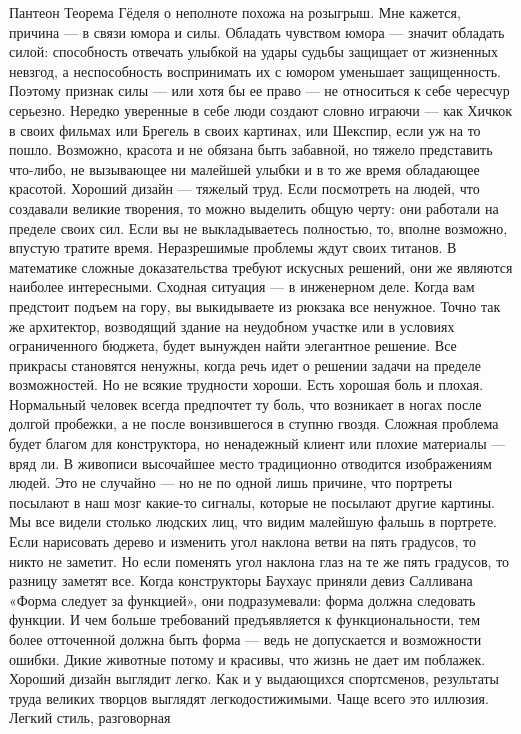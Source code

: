 \documentclass[ebook,12pt,oneside,openany]{memoir}
\begin{document}
Пантеон Теорема Гёделя о неполноте похожа на розыгрыш. Мне кажется,
причина — в связи юмора и силы. Обладать чувством юмора — значит
обладать силой: способность отвечать улыбкой на удары судьбы защищает
от жизненных невзгод, а неспособность воспринимать их с юмором
уменьшает защищенность. Поэтому признак силы — или хотя бы ее право —
не относиться к себе чересчур серьезно. Нередко уверенные в себе люди
создают словно играючи — как Хичкок в своих фильмах или Брегель в
своих картинах, или Шекспир, если уж на то пошло. Возможно, красота и
не обязана быть забавной, но тяжело представить что-либо, не
вызывающее ни малейшей улыбки и в то же время обладающее красотой.
Хороший дизайн — тяжелый труд. Если посмотреть на людей, что создавали
великие творения, то можно выделить общую черту: они работали на
пределе своих сил. Если вы не выкладываетесь полностью, то, вполне
возможно, впустую тратите время. Неразрешимые проблемы ждут своих
титанов. В математике сложные доказательства требуют искусных решений,
они же являются наиболее интересными. Сходная ситуация — в инженерном
деле. Когда вам предстоит подъем на гору, вы выкидываете из рюкзака
все ненужное. Точно так же архитектор, возводящий здание на неудобном
участке или в условиях ограниченного бюджета, будет вынужден найти
элегантное решение. Все прикрасы становятся ненужны, когда речь идет о
решении задачи на пределе возможностей. Но не всякие трудности хороши.
Есть хорошая боль и плохая. Нормальный человек всегда предпочтет ту
боль, что возникает в ногах после долгой пробежки, а не после
вонзившегося в ступню гвоздя. Сложная проблема будет благом для
конструктора, но ненадежный клиент или плохие материалы — вряд ли. В
живописи высочайшее место традиционно отводится изображениям людей.
Это не случайно — но не по одной лишь причине, что портреты посылают в
наш мозг какие-то сигналы, которые не посылают другие картины. Мы все
видели столько людских лиц, что видим малейшую фальшь в портрете. Если
нарисовать дерево и изменить угол наклона ветви на пять градусов, то
никто не заметит. Но если поменять угол наклона глаз на те же пять
градусов, то разницу заметят все. Когда конструкторы Баухаус приняли
девиз Салливана «Форма следует за функцией», они подразумевали: форма
должна следовать функции. И чем больше требований предъявляется к
функциональности, тем более отточенной должна быть форма — ведь не
допускается и возможности ошибки. Дикие животные потому и красивы, что
жизнь не дает им поблажек. Хороший дизайн выглядит легко. Как и у
выдающихся спортсменов, результаты труда великих творцов выглядят
легкодостижимыми. Чаще всего это иллюзия. Легкий стиль, разговорная
\end{document}
